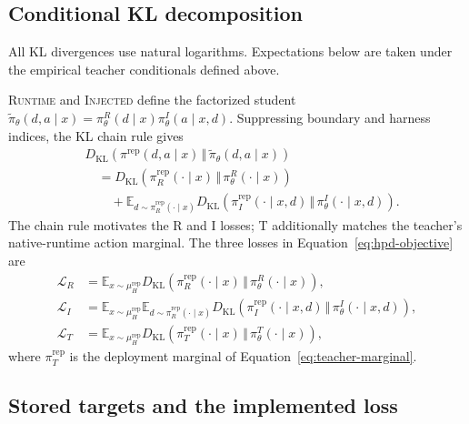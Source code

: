 \documentclass{article}
\newcommand{\injected}{\textsc{Injected}}
\newcommand{\runtime}{\textsc{Runtime}}
\begin{document}
\subsection{Conditional KL decomposition}

All KL divergences use natural logarithms. Expectations below are taken
under the empirical teacher conditionals defined above.

\runtime{} and \injected{} define the factorized student
$\widetilde\pi_\theta(d,a\mid x)=
\pi_\theta^R(d\mid x)\pi_\theta^I(a\mid x,d)$. Suppressing boundary and
harness indices, the KL chain rule gives
\begin{equation}
\begin{aligned}
&D_{\mathrm{KL}}\!\left(
\pi^{\mathrm{rep}}(d,a\mid x)\,\Vert\,
\widetilde\pi_\theta(d,a\mid x)\right)\\
&\quad=D_{\mathrm{KL}}\!\left(
\pi_R^{\mathrm{rep}}(\cdot\mid x)\,\Vert\,
\pi_\theta^R(\cdot\mid x)\right)\\
&\qquad+\mathbb E_{d\sim\pi_R^{\mathrm{rep}}(\cdot\mid x)}
D_{\mathrm{KL}}\!\left(
\pi_I^{\mathrm{rep}}(\cdot\mid x,d)\,\Vert\,
\pi_\theta^I(\cdot\mid x,d)\right).
\end{aligned}
\label{eq:kl-chain}
\end{equation}
The chain rule motivates the R and I losses; T additionally matches the
teacher's native-runtime action marginal. The three losses in
Equation~\ref{eq:hpd-objective} are
\begin{equation}
\begin{aligned}
\mathcal L_R
&=\mathbb E_{x\sim\mu_H^{\mathrm{rep}}}
D_{\mathrm{KL}}\!\left(
\pi_R^{\mathrm{rep}}(\cdot\mid x)\,\Vert\,
\pi_\theta^R(\cdot\mid x)\right),\\
\mathcal L_I
&=\mathbb E_{x\sim\mu_H^{\mathrm{rep}}}
\mathbb E_{d\sim\pi_R^{\mathrm{rep}}(\cdot\mid x)}
D_{\mathrm{KL}}\!\left(
\pi_I^{\mathrm{rep}}(\cdot\mid x,d)\,\Vert\,
\pi_\theta^I(\cdot\mid x,d)\right),\\
\mathcal L_T
&=\mathbb E_{x\sim\mu_H^{\mathrm{rep}}}
D_{\mathrm{KL}}\!\left(
\pi_T^{\mathrm{rep}}(\cdot\mid x)\,\Vert\,
\pi_\theta^T(\cdot\mid x)\right),
\end{aligned}
\label{eq:conditional-view-losses}
\end{equation}
where $\pi_T^{\mathrm{rep}}$ is the deployment marginal of
Equation~\ref{eq:teacher-marginal}.

\subsection{Stored targets and the implemented loss}
\end{document}
